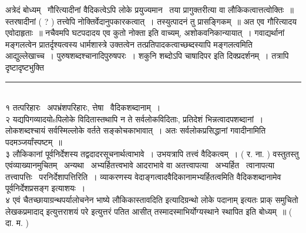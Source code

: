 \documentclass[11pt, openany]{book}
\begin{document}
\begin{multicols}{2}
अत्रेदं बोध्यम् \textendash\ गौरित्यादीनां वैदिकत्वेऽपि लोके प्रयुज्यमान \textendash\ तया प्रागुक्तरीत्या वा लौकिकत्वात्तत्वोक्तिः~॥ स्तरषादीनां ( ? ) तत्त्वेपि नोक्तिर्वेदानुपकारकत्वात्~। तस्युत्पादनं तु प्रासङ्गिकम्~॥ अत एव गौरित्यादय एवोदाहृताः~॥ नचैवमपि घटपदादय एव कुतो नोक्ता इति वाच्यम्, अशोकवनिकान्यायात्~। गवाद्यर्थानां मङ्गलत्वेन प्रातर्दृश्यत्वस्य धार्मशास्त्रे उक्तत्वेन तत्प्रतिपादकत्वाच्छब्दस्यापि मङ्गलत्वमिति आद्युल्लेखाच्च~। पुरुषशब्दश्चानादिपुरुषपरः~। शकुनि शब्दोऽपि चाषादिपर इति दिक्प्रदर्शनम्~। तत्रापि दृष्टादृष्टभुक्ति \textendash\

\noindent
\rule{1\linewidth}{0.5pt}\\

१ तत्परिहारः \textendash\ अपभ्रंशपरिहारः, त्तेषा \textendash\ वैदिकशब्दानाम्~।\\

२ यद्यपिगव्यादयोsपिलोके विदितास्तथापि न ते सर्वलोकविदिताः, प्रतिदेशं भिन्नत्वादपशब्दानां~। लोकशब्दश्चायं सर्वस्मिल्लोके वर्तते सङ्कोचकाभावात्~। अतः सर्वलोकप्रसिद्धानां गवादीनामिति पदमञ्जर्यांस्पष्टम्~॥\\

३ लौकिकानां पूर्वनिर्देशस्य तद्वदादरसूचनार्थत्वाभावे~। उभयत्रापि तत्त्वं वैदिकत्वम्~। ( र. ना. ) वस्तुतस्तु एवंव्याख्यानमुचितम् \textendash\ अन्यथा \textendash\ अभ्यर्हितत्त्वभावे आदराभावे वा अतत्त्वापत्या \textendash\ अभ्यर्हित \textendash\ त्वानापत्या तत्त्वापत्तिः \textendash\ परनिर्देशापत्तिरिति~। व्याकरणस्य वेदाङ्गत्वादवैदिकानामभ्यर्हितत्वमिति वैदिकशब्दानामेव पूर्वनिर्देशप्रसङ्ग इत्याशयः~।\\

४ एवं चैतच्छायाग्रन्थपर्यालोचनेन {\qt भाष्ये लौकिकास्तावदिति} इत्यादिग्रन्थो {\qt लोके पदानाम्} इत्यतः प्राक् समुचितो लेखकप्रमादाद् {\qt इत्युत्तराशयं परे} इत्युत्तरं पतित आसीत् तस्मादस्माभिर्योग्यस्थाने स्थापित इति बोध्यम्~॥ ( दा. म. ) 
\end{multicols}

\newpage
\end{document}

